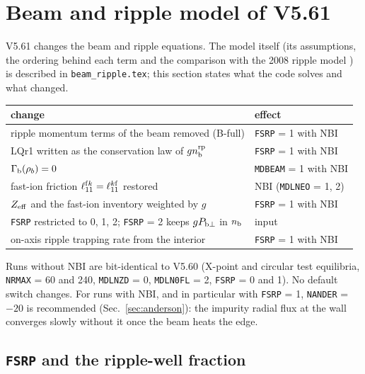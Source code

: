 \documentclass[11pt]{article}
\def\r#1{{\rm#1}}
\def\nb{n_\r{b}}
\def\nbrp{n_\r{b}^\r{rp}}
\begin{document}
\clearpage
\section{Beam and ripple model of V5.61}
\setcounter{equation}{0}
\label{sec:v561}

V5.61 changes the beam and ripple equations.  The model itself (its
assumptions, the ordering behind each term and the comparison with the 2008
ripple model \cite{NF2008}) is described in \texttt{beam\_ripple.tex}; this
section states what the code solves and what changed.

\begin{center}
\begin{tabular}{|l|l|}\hline
change & effect \\\hline
ripple momentum terms of the beam removed (B-full) & \texttt{FSRP} = 1 with NBI \\
LQr1 written as the conservation law of $g\nbrp$ & \texttt{FSRP} = 1 with NBI \\
$\Gamma_\r{b}(\rho_b) = 0$ & \texttt{MDBEAM} = 1 with NBI \\
fast-ion friction $\ell_{11}^{\r{f}k} = \ell_{11}^{k\r{f}}$ restored & NBI (\texttt{MDLNEO} = 1, 2) \\
$Z_\r{eff}$ and the fast-ion inventory weighted by $g$ & \texttt{FSRP} = 1 with NBI \\
\texttt{FSRP} restricted to 0, 1, 2; \texttt{FSRP} = 2 keeps $g P_{\r{b}\perp}$ in $\nb$ & input \\
on-axis ripple trapping rate from the interior & \texttt{FSRP} = 1 with NBI \\\hline
\end{tabular}
\end{center}

Runs without NBI are bit-identical to V5.60 (X-point and circular test
equilibria, \texttt{NRMAX} = 60 and 240, \texttt{MDLNZD} = 0, \texttt{MDLN0FL} = 2,
\texttt{FSRP} = 0 and 1).  No default switch changes.  For runs with NBI, and in
particular with \texttt{FSRP} = 1, \texttt{NANDER} = $-20$ is recommended
(Sec.~\ref{sec:anderson}): the impurity radial flux at the wall converges slowly
without it once the beam heats the edge.

\subsection{\texttt{FSRP} and the ripple-well fraction}
\end{document}
